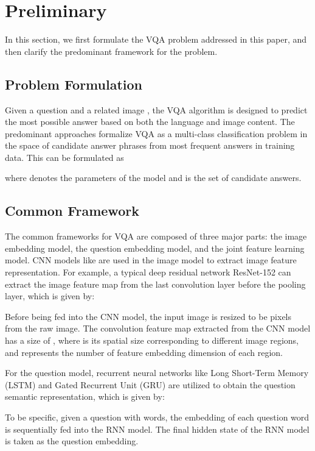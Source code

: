 \documentclass[sigconf]{acmart}
\begin{document}
\section{Preliminary}

In this section, we first formulate the VQA problem addressed in this paper, and then clarify the predominant framework for the problem.

\subsection{Problem Formulation}
Given a question  and a related image , the VQA algorithm is designed to predict the most possible answer  based on both the language and image content. The predominant approaches formalize VQA as a multi-class classification problem in the space of candidate answer phrases from most frequent answers in training data. This can be formulated as

where  denotes the parameters of the model and  is the set of candidate answers.

\subsection{Common Framework}
The common frameworks for VQA are composed of three major parts: the image embedding model, the question embedding model, and the joint feature learning model. CNN models like \cite{simonyan2014very,he2016deep} are used in the image model to extract image feature representation. For example, a typical deep residual network ResNet-152 \cite{he2016deep} can extract the image feature map   from the last convolution layer before the pooling layer, which is given by:

Before being fed into the CNN model, the input image is resized to be  pixels from the raw image.
The convolution feature map extracted from the CNN model has a size of , where  is its spatial size corresponding to different image regions, and  represents the number of feature embedding dimension of each region.

For the question model, recurrent neural networks like Long Short-Term Memory (LSTM) \cite{hochreiter1997long} and Gated Recurrent Unit (GRU) \cite{cho2014learning} are utilized to obtain the question semantic representation, which is given by:

To be specific, given a question with  words, the embedding of each question word is sequentially fed into the RNN model. The final hidden state  of the RNN model is taken as the question embedding.
\end{document}
